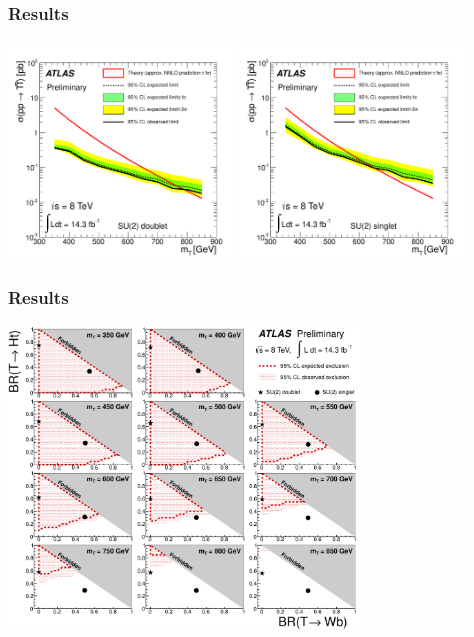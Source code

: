 \begin{frame}\frametitle{Results}
\centering\footnotesize

\includegraphics[width=0.45\textwidth]{pics/lim_doublet}
\includegraphics[width=0.45\textwidth]{pics/lim_singlet}


\end{frame}

\begin{frame}\frametitle{Results}
\centering\footnotesize

\includegraphics[width=0.7\textwidth]{pics/lim_2D}

\end{frame}



